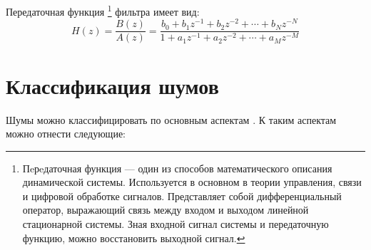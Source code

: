 Передаточная функция \footnote{Пeрeдаточная функция --- один из способов математического описания динамической системы. Используется в основном в теории управления, связи и цифровой обработке сигналов. Представляет собой дифференциальный оператор, выражающий связь между входом и выходом линейной стационарной системы. Зная входной сигнал системы и передаточную функцию, можно восстановить выходной сигнал.} фильтра имеет вид:
\begin{equation}
	H(z) = \frac{B(z)}{A(z)}  = \frac{{b_{0}+b_{1}z^{-1}+b_{2}z^{-2} + \cdots + b_{N}z^{-N}}}{{1+a_{1}z^{-1}+a_{2}z^{-2} + \cdots +a_{M}z^{-M}}}
\end{equation}

\section{Классификация шумов}
Шумы можно классифицировать по основным аспектам \cite{noise1}. К таким аспектам можно отнести следующие:
